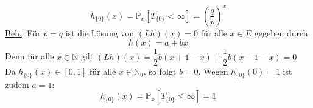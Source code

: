 \begin{equation*}
h_{\lbrace 0 \rbrace}(x) = \mathbb{P}_{x}[T_{\lbrace 0 \rbrace} < \infty] = (\dfrac{q}{p})^{x}
\end{equation*}
\underline{Beh.}: Für $p=q$ ist die Lösung von $(Lh)(x) = 0$ für alle  $x \in E$ gegeben durch 
\begin{equation*}
h(x) = a + bx
\end{equation*}
Denn für alle $x \in \mathbb{N}$ gilt $(Lh)(x) = \dfrac{1}{2}b(x + 1 -x) + \dfrac{1}{2}b(x -1 -x) = 0$
\\
Da $h_{\lbrace 0 \rbrace}(x) \in [0,1]$ für alle $x \in \mathbb{N}_{0}$, so folgt $b=0$. Wegen $h_{\lbrace 0 \rbrace}(0) = 1$ ist zudem $a = 1$:
\begin{equation*}
h_{\lbrace 0 \rbrace}(x) = \mathbb{P}_{x}[T_{\lbrace 0 \rbrace} \leq \infty] = 1
\end{equation*}